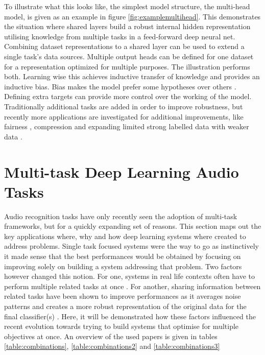 To illustrate what this looks like, the simplest model structure, the multi-head model, is given as an example in figure \ref{fig:examplemultihead}. This demonstrates the situation where shared layers build a robust internal hidden representation utilising knowledge from multiple tasks in a feed-forward deep neural net. Combining dataset representations to a shared layer can be used to extend a single task's data sources. Multiple output heads can be defined for one dataset for a representation optimized for multiple purposes. The illustration performs both. Learning wise this achieves inductive transfer of knowledge and provides an inductive bias. Bias makes the model prefer some hypotheses over others \cite{caruana1997multitask}. Defining extra targets can provide more control over the working of the model. Traditionally additional tasks are added in order to improve robustness, but recently more applications are investigated for additional improvements, like fairness \citep{oneto2019taking}, compression \citep{georgiev2017heterogeneous} and expanding limited strong labelled data with weaker data \cite{lee2019label}.\\




\section{Multi-task Deep Learning Audio Tasks}

Audio recognition tasks have only recently seen the adoption of multi-task frameworks, but for a quickly expanding set of reasons. This section maps out the key applications where, why and how deep learning systems where created to address problems. Single task focused systems were the way to go as instinctively it made sense that the best performances would be obtained by focusing on improving solely on building a system addressing that problem. Two factors however changed this notion. For one, systems in real life contexts often have to perform multiple related tasks at once \cite{ziaei2013prof} . For another, sharing information between related tasks have been shown to improve performances as it averages noise patterns and creates a more robust representation of the original data for the final classifier(s) \citep{xia2019multi}. Here, it will be demonstrated how these factors influenced the recent evolution towards trying to build systems that optimise for multiple objectives at once. An overview of the used papers is given in tables \ref{table:combinations}, \ref{table:combinations2} and \ref{table:combinations3} \\

